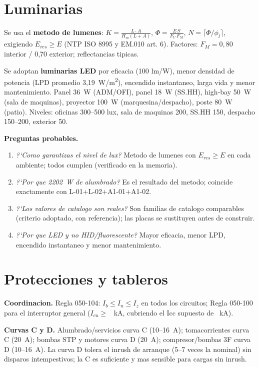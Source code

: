 \documentclass[12pt,letterpaper]{report}
\begin{document}
\section{Luminarias}

Se usa el \textbf{metodo de lumenes}:
\(K = \frac{L\cdot A}{H_m(L+A)}\), \(\Phi = \frac{E\,S}{F_U\,F_M}\),
\(N = \lceil\Phi/\phi_l\rceil\), exigiendo \(E_{res} \geq E\) (NTP ISO 8995 y
EM.010 art. 6). Factores: \(F_M=0,80\) interior / 0,70 exterior; reflectancias
tipicas.

Se adoptan \textbf{luminarias LED} por eficacia (100 lm/W), menor densidad de
potencia (LPD promedio 3,19~W/m\textsuperscript{2}), encendido instantaneo,
larga vida y menor mantenimiento. Panel 36~W (ADM/OFI), panel 18~W (SS.HH),
high-bay 50~W (sala de maquinas), proyector 100~W (marquesina/despacho), poste
80~W (patio). Niveles: oficinas 300--500 lux, sala de maquinas 200, SS.HH 150,
despacho 150--200, exterior 50.

\textbf{Preguntas probables.}
\begin{enumerate}
\item \emph{?`Como garantizas el nivel de lux?} Metodo de lumenes con
  \(E_{res} \geq E\) en cada ambiente; todos cumplen (verificado en la memoria).
\item \emph{?`Por que 2202~W de alumbrado?} Es el resultado del metodo; coincide
  exactamente con L-01+L-02+A1-01+A1-02.
\item \emph{?`Los valores de catalogo son reales?} Son familias de catalogo
  comparables (criterio adoptado, con referencia); las placas se sustituyen
  antes de construir.
\item \emph{?`Por que LED y no HID/fluorescente?} Mayor eficacia, menor LPD,
  encendido instantaneo y menor mantenimiento.
\end{enumerate}

\section{Protecciones y tableros}

\textbf{Coordinacion.} Regla 050-104: \(I_b \leq I_n \leq I_z\) en todos los
circuitos; Regla 050-100 para el interruptor general (\(I_{cu} \geq\)
\Icu~kA, cubriendo el Icc supuesto de \IccAsumido~kA).

\textbf{Curvas C y D.} Alumbrado/servicios curva C (10--16~A); tomacorrientes
curva C (20~A); bombas STP y motores curva D (20~A); compresor/bombas 3F curva D
(10--16~A). La curva D tolera el inrush de arranque (5--7 veces la nominal) sin
disparos intempestivos; la C es suficiente y mas sensible para cargas sin
inrush.
\end{document}

